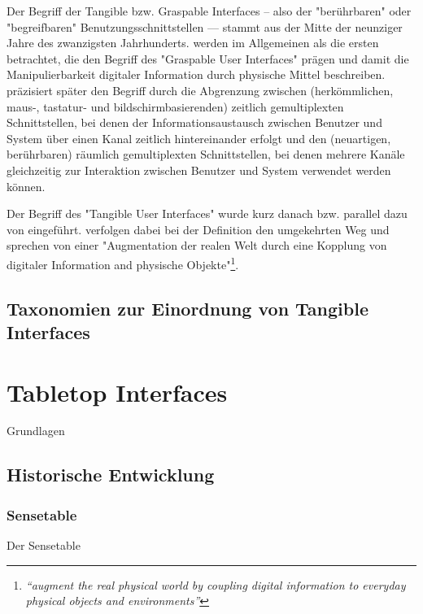 Der Begriff der Tangible bzw. Graspable Interfaces – also der "berührbaren" oder "begreifbaren" Benutzungsschnittstellen — stammt aus der Mitte der neunziger Jahre des zwanzigsten Jahrhunderts. \citet{Fitzmaurice95} werden im Allgemeinen als die ersten betrachtet, die den Begriff des "Graspable User Interfaces" prägen und damit die Manipulierbarkeit digitaler Information durch physische Mittel beschreiben. \citet{Fitzmaurice96} präzisiert später den Begriff durch die Abgrenzung zwischen (herkömmlichen, maus-, tastatur- und bildschirmbasierenden) zeitlich gemultiplexten Schnittstellen, bei denen der Informationsaustausch zwischen Benutzer und System über einen Kanal zeitlich hintereinander erfolgt und den (neuartigen, berührbaren) räumlich gemultiplexten Schnittstellen, bei denen mehrere Kanäle gleichzeitig zur Interaktion zwischen Benutzer und System verwendet werden können. 

Der Begriff des "Tangible User Interfaces" wurde kurz danach bzw. parallel dazu von \citet{Ishii97} eingeführt. \citeauthor{Ishii97} verfolgen dabei bei der Definition den umgekehrten Weg und sprechen von einer "Augmentation der realen Welt durch eine Kopplung von digitaler Information and physische Objekte"\footnote{\emph{“augment the real physical world by coupling digital information to everyday physical objects and environments”}\citep{Ishii97}}. 

\subsection{Taxonomien zur Einordnung von Tangible Interfaces} %
\label{sub:tangibles_taxonomien}


\section{Tabletop Interfaces} %
\label{sec:tabletop_interfaces}

Grundlagen

\subsection{Historische Entwicklung} %
\label{sub:historische_entwicklung_von_tabletop_interfaces}

\subsubsection{Sensetable} %
\label{subs:sensetable}
Der Sensetable \citep{Patten01}

